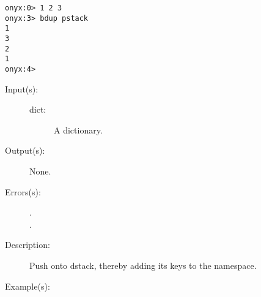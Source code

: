\begin{description}
\begin{description}
\begin{verbatim}
onyx:0> 1 2 3
onyx:3> bdup pstack
1
3
2
1
onyx:4>
		\end{verbatim}
	\end{description}
\label{systemdict:begin}
\item[{\onyxop{dict}{begin}{--}}: ]
	\begin{description}\item[]
	\item[Input(s): ]
		\begin{description}\item[]
		\item[dict: ]
			A dictionary.
		\end{description}
	\item[Output(s): ] None.
	\item[Errors(s): ]
		\begin{description}\item[]
		\item[.]
		\item[.]
		\end{description}
	\item[Description: ]
		Push  onto dstack, thereby adding its keys to the
		namespace.
	\item[Example(s): ]\begin{verbatim}


\end{verbatim}
\end{description}
\end{description}
